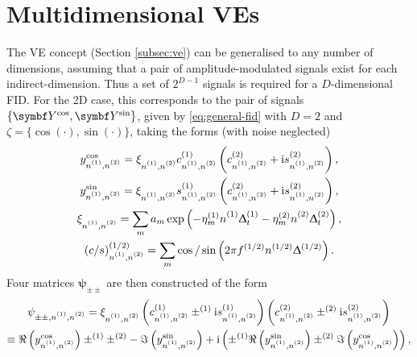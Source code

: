 \section{Multidimensional \aclp{VE}}
\label{sec:multidim-ve}
The \ac{VE} concept (Section \ref{subsec:ve}) can be generalised to any number
of dimensions, assuming that a pair of amplitude-modulated signals exist for
each indirect-dimension. Thus a set of $2^{D-1}$ signals is required for a
$D$-dimensional \ac{FID}.
For the \ac{2D} case, this corresponds to the pair of signals $\lbrace
\bY^{\cos}, \bY^{\sin} \rbrace$, given by \eqref{eq:general-fid} with $D=2$ and
$\zeta = \lbrace \cos(\cdot), \sin(\cdot) \rbrace$, taking the forms (with
noise neglected)
\begin{subequations}
    \begin{gather}
        y^{\cos}_{\none,\ntwo} =
            \xi^{\vphantom{(1)}}_{\none,\ntwo}
            c^{(1)}_{\none,\ntwo}
            \left(c^{(2)}_{\none,\ntwo} + \iu s^{(2)}_{\none,\ntwo}\right),\\
        y^{\sin}_{\none,\ntwo} =
            \xi^{\vphantom{(1)}}_{\none,\ntwo}
            s^{(1)}_{\none,\ntwo}
            \left(c^{(2)}_{\none,\ntwo} + \iu s^{(2)}_{\none,\ntwo}\right),\\
        \xi^{\vphantom{(1)}}_{\none,\ntwo} =
            \sum_m a_m \exp\left(-\etaonem \none \Dtone -\etatwom \ntwo \Dttwo\right),\\
        (c/s)^{(1/2)}_{\none,\ntwo} =
            \sum_m \cos / \sin \left(2 \pi f^{(1/2)} n^{(1/2)} \Updelta^{(1/2)}\right).
    \end{gather}
\end{subequations}
Four matrices $\symbf{\psi}_{\pm\pm}$ are then constructed of the form
\begin{equation}
    \begin{gathered}
        \psi_{\pm\pm, \none, \ntwo} =
            \xi_{\none,\ntwo}^{\vphantom{(1)}}
            \left(c^{(1)}_{\none,\ntwo} \pm^{(1)} \iu s^{(1)}_{\none,\ntwo}\right)
            \left(c^{(2)}_{\none,\ntwo} \pm^{(2)} \iu s^{(2)}_{\none,\ntwo}\right)\\
         \equiv
             \Re\left( y^{\cos}_{\none,\ntwo} \right)
             \pm^{(1)} \pm^{(2)} -
             \Im\left( y^{\sin}_{\none,\ntwo} \right)
             + \iu \left(
             \pm^{(1)}
             \Re\left( y^{\sin}_{\none,\ntwo} \right)
             \pm^{(2)}
             \Im\left( y^{\cos}_{\none,\ntwo} \right)
             \right),
    \end{gathered}
\end{equation}
